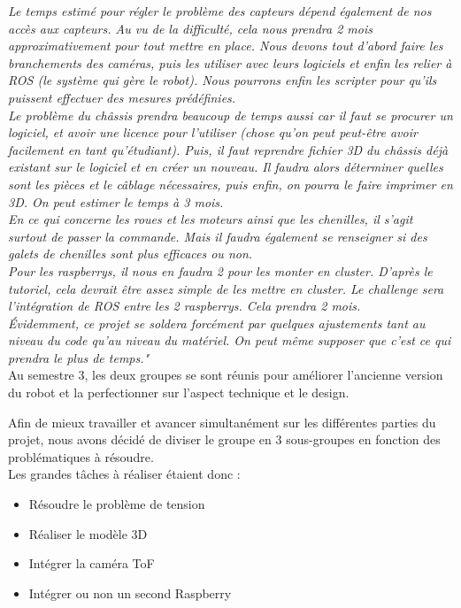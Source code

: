 \documentclass{PackagerQualityN}
\begin{document}
\textit{Le temps estimé pour régler le problème des capteurs dépend également de nos accès aux capteurs. Au vu de la difficulté, cela nous prendra 2 mois approximativement pour tout mettre en place. Nous devons tout d’abord faire les branchements des caméras, puis les utiliser avec leurs logiciels et enfin les relier à ROS (le système qui gère le robot). Nous pourrons enfin les scripter pour qu’ils puissent effectuer des mesures prédéfinies.}\\

\textit{Le problème du châssis prendra beaucoup de temps aussi car il faut se procurer un logiciel, et avoir une licence pour l’utiliser (chose qu’on peut peut-être avoir facilement en tant qu’étudiant). Puis, il faut reprendre fichier 3D du châssis déjà existant sur le logiciel et en créer un nouveau. Il faudra alors déterminer quelles sont les pièces et le câblage nécessaires, puis enfin, on pourra le faire imprimer en 3D. On peut estimer le temps à 3 mois.}\\

\textit{En ce qui concerne les roues et les moteurs ainsi que les chenilles, il s’agit surtout de passer la commande. Mais il faudra également se renseigner si des galets de chenilles sont plus efficaces ou non.}\\
 

\textit{Pour les raspberrys, il nous en faudra 2 pour les monter en cluster. D’après le tutoriel, cela devrait être assez simple de les mettre en cluster. Le challenge sera l’intégration de ROS entre les 2 raspberrys. Cela prendra 2 mois.}\\

\textit{Évidemment, ce projet se soldera forcément par quelques ajustements tant au niveau du code qu’au niveau du matériel. On peut même supposer que c’est ce qui prendra le plus de temps."} \\


Au semestre 3, les deux groupes se sont réunis pour améliorer l’ancienne version du robot et la perfectionner sur l’aspect technique et le design.

Afin de mieux travailler et avancer simultanément sur les différentes parties du projet, nous avons décidé de diviser le groupe en 3 sous-groupes en fonction des problématiques à résoudre.\\

Les grandes tâches à réaliser étaient donc :
\begin{itemize}
    \item Résoudre le problème de tension
    \item Réaliser le modèle 3D
    \item Intégrer la caméra ToF
    \item Intégrer ou non un second Raspberry\\
\end{itemize}
\end{document}
